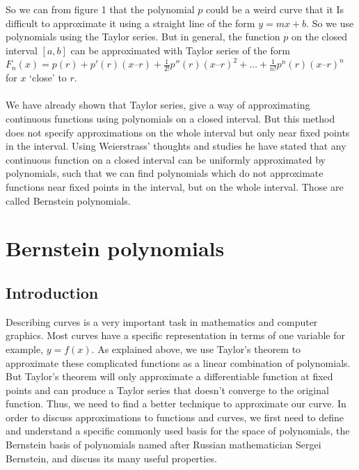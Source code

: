 \documentclass{article}
\begin{document}
So we can from figure 1 that the polynomial $p$ could be a weird curve that it Is difficult to approximate it using a straight line of the form $y=mx+b$. So we use polynomials using the Taylor series.
But in general, the function $p$ on the closed interval $[a,b]$ can be approximated with Taylor series of the form $F_n(x) = p(r) + p'(r)(x – r) + \frac{1}{2!}p''(r) (x – r)^2 + … + \frac{1}{n!} p^n(r)(x – r)^n$ for $x$ `close' to $r$.
\paragraph{}
We have already shown that Taylor series, give a way of approximating continuous functions using polynomials on a closed interval. But this method does not specify approximations on the whole interval but only near fixed points in the interval. Using Weierstrass’ thoughts and studies he have stated that any continuous function on a closed interval can be uniformly approximated by polynomials, such that we can find polynomials which do not approximate functions near fixed points in the interval, but on the whole interval. Those are called Bernstein polynomials.
\section{Bernstein polynomials}
\subsection{Introduction}
Describing curves is a very important task in mathematics and computer graphics. Most curves have a specific  representation in terms of one variable for example, $y = f(x)$. As explained above, we use Taylor’s theorem to approximate these complicated functions as a linear combination of polynomials. But Taylor’s theorem will only approximate a differentiable function at fixed points and can produce a Taylor series that doesn’t converge to the original function. Thus, we need to find a better technique to approximate our curve.
In order to discuss approximations to functions and curves, we first need to define and understand a specific commonly used basis for the space of polynomials, the Bernstein basis of polynomials named after Russian mathematician Sergei Bernstein, and discuss its many useful properties.
\end{document}
